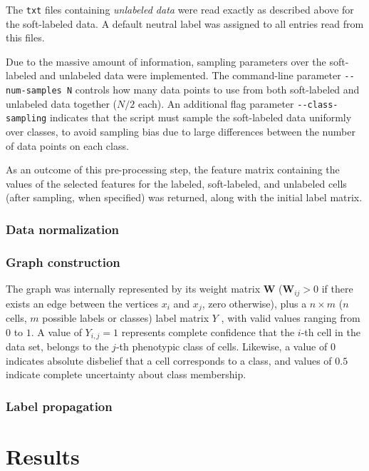 \documentclass[oneside, a4paper, draft]{memoir} %
\begin{document}
The \texttt{txt} files containing \emph{unlabeled data} were read exactly as described above for the soft-labeled
data. A default neutral label was assigned to all entries read from this files.

Due to the massive amount of information, sampling parameters over the soft-labeled and unlabeled data were
implemented. The command-line parameter \texttt{-{}-num-samples N} controls how many data points to use from both
soft-labeled and unlabeled data together ($N/2$ each). An additional flag parameter \texttt{-{}-class-sampling}
indicates that the script must sample the soft-labeled data uniformly over classes, to avoid sampling bias due to
large differences between the number of data points on each class.

As an outcome of this pre-processing step, the feature matrix containing the values of the selected features
for the labeled, soft-labeled, and unlabeled cells (after sampling, when specified) was returned, along with
the initial label matrix.

\subsubsection{Data normalization}
\lipsum[75]

\subsubsection{Graph construction}
The graph was internally represented by its weight matrix $\mathbf{W}$ ($\mathbf{W}_{ij}>0$ if there exists
an edge between the vertices $x_i$ and $x_j$, zero otherwise), plus a $n \times m$
($n$ cells, $m$ possible labels or classes) label matrix $Y$ , with valid values ranging from $0$ to $1$. A value
of $Y_{i,j}=1$ represents complete confidence that the $i$-th cell in the data set, belongs to the $j$-th
phenotypic class of cells. Likewise, a value of $0$ indicates absolute disbelief that a cell corresponds to a
class, and values of $0.5$ indicate complete uncertainty about class membership.

\subsubsection{Label propagation}
\textcolor{gray}{\lipsum[44]}

\section{Results}
\textcolor{gray}{\lipsum[8]}
\end{document}
